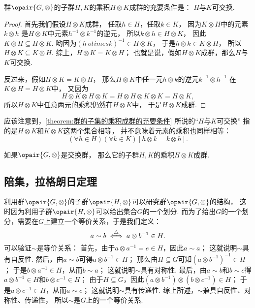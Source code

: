 \begin{theorem}\label{theorem:群的子集的乘积成群的充要条件}
群\(\opair{G,\otimes}\)的子群\(H,K\)的乘积\(H \otimes K\)成群的充要条件是：
\(H\)与\(K\)可交换.
\begin{proof}
首先我们假设\(H \otimes K\)成群，
任取\(h \in H\)，任取\(k \in K\)，
因为\(K \otimes H\)中的元素\(k \otimes h\)
是\(H \otimes K\)中元素\(h^{-1} \otimes k^{-1}\)的逆元，
所以\(k \otimes h \in H \otimes K\)，
因此\(K \otimes H \subseteq H \otimes K\).
哟因为\((h\ otimes k)^{-1} \in H \otimes K\)，
于是\(h \otimes k \in K \otimes H\)，
所以\(H \otimes K \subseteq K \otimes H\).
综上，\(H \otimes K = K \otimes H\)；
也就是说，假如\(H \otimes K\)成群，那么\(H\)与\(K\)可交换.

反过来，假如\(H \otimes K = K \otimes H\)，
那么\(H \otimes K\)中任一元\(h \otimes k\)的逆元\(k^{-1} \otimes h^{-1}\)
在\(K \otimes H = H \otimes K\)中，
又因为\[
	H \otimes K \otimes H \otimes K
	= H \otimes H \otimes K \otimes K
	= H \otimes K,
\]
所以\(H \otimes K\)中任意两元的乘积仍然在\(H \otimes K\)中，
于是\(H \otimes K\)成群.
\end{proof}
\end{theorem}

应该注意到，\cref{theorem:群的子集的乘积成群的充要条件} 所说的“\(H\)与\(K\)可交换”
指的是\(H \otimes K\)和\(K \otimes K\)这两个集合相等，
并不意味着元素的乘积也同样相等：\[
	(\forall h \in H)(\forall k \in K)[h \otimes k = k \otimes h].
\]

\begin{corollary}
如果\(\opair{G,\otimes}\)是交换群，
那么它的子群\(H,K\)的乘积\(H \otimes K\)成群.
\end{corollary}

\subsection{陪集，拉格朗日定理}
\begingroup
\def\RQuotient{G/\kern-2pt\sim}
\def\LQuotient{G/\kern-2pt\backsim}

利用群\(\opair{G,\otimes}\)的子群\(\opair{H,\otimes}\)可以研究群\(\opair{G,\otimes}\)的结构，
这时因为利用子群\(\opair{H,\otimes}\)可以给出集合\(G\)的一个划分.
而为了给出\(G\)的一个划分，需要在\(G\)上建立一个等价关系，于是我们定义：\[
	a \sim b
	\overset{\triangle}{\iff}
	a \otimes b^{-1} \in H.
\]
可以验证\(\sim\)是等价关系：
首先，由于\(a \otimes a^{-1} = e \in H\)，因此\(a \sim a\)；
这就说明\(\sim\)具有自反性.
然后，由\(a \sim b\)可得\(a \otimes b^{-1} \in H\)；
那么由\(H \subseteq G\)可知\((a \otimes b^{-1})^{-1} \in H\)；
于是\(b \otimes a^{-1} \in H\)，从而\(b \sim a\)；
这就说明\(\sim\)具有对称性.
最后，由\(a \sim b\)和\(b \sim c\)得\(a \otimes b^{-1} \in H\)和\(b \otimes c^{-1} \in H\)；
由于\(H \subseteq G\)，因此\((a \otimes b^{-1}) \otimes (b \otimes c^{-1}) \in H\)；
于是\(a \otimes c^{-1} \in H\)，从而\(a \sim c\)；
这就说明\(\sim\)具有传递性.
综上所述，\(\sim\)兼具自反性、对称性、传递性，
所以\(\sim\)是\(G\)上的一个等价关系.

